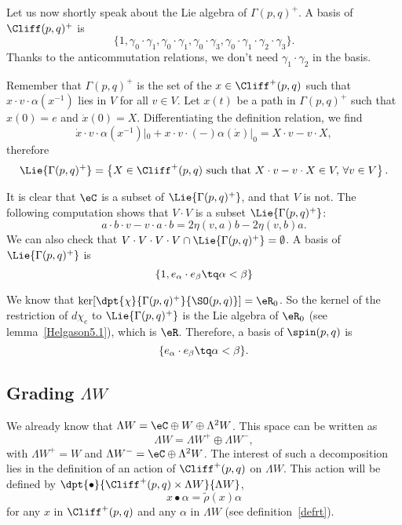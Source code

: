 Let us now shortly speak about the Lie algebra of $\Gamma(p,q)^+$. A basis of $\Cliff(p,q)^+$ is \[\{1,\gamma_0\cdot\gamma_1,\gamma_0\cdot\gamma_1 ,\gamma_0\cdot\gamma_3
	,\gamma_0\cdot\gamma_1\cdot\gamma_2\cdot\gamma_3  \}.\] Thanks to the anticommutation relations, we don't need $\gamma_1\cdot\gamma_2$ in the basis.

Remember that $\Gamma(p,q)^+$ is the set of the $x\in\Cliff^+(p,q)$ such that $x\cdot v\cdot\alpha(x^{-1})$ lies in $V$ for all $v\in V$. Let $x(t)$ be a path in $\Gamma(p,q)^+$ such that $x(0)=e$ and $\dot{x}(0)=X$. Differentiating the definition relation, we find
\[
	\dot{x}\cdot v\cdot\alpha(x^{-1})|_0+x\cdot v\cdot(-)\alpha(\dot{x})|_0=X\cdot v-v\cdot X,
\]
therefore
\[
	\Lie{\Gamma(p,q)^+}=\left\{X\in\Cliff^+(p,q)\textrm{ such that } X\cdot v-v\cdot X\in V,\,\forall v\in V\right\}.
\]

It is clear that $\eC$ is a subset of $\Lie{\Gamma(p,q)^+}$, and that $V$ is not. The following computation shows that $V\cdot V$ is a subset $\Lie{\Gamma(p,q)^+}$:
\[
	a\cdot b\cdot v-v\cdot a\cdot b=2\eta(v,a)b-2\eta(v,b)a.
\]
We can also check that $V\cdot V\cdot V\cdot V\cap\Lie{\Gamma(p,q)^+}=\emptyset$. A basis of $\Lie{\Gamma(p,q)^+}$ is
\[
	\{ 1,e_{\alpha}\cdot e_{\beta}\tq \alpha<\beta \}
\]

We know that $\ker[\dpt{\chi}{\Gamma(p,q)^+}{\SO(p,q)}]=\eR_0$. So the kernel of the restriction of $d\chi_e$ to $\Lie{\Gamma(p,q)^+}$ is the Lie algebra of $\eR_0$ (see lemma~\ref{Helgason5.1}), which is $\eR$. Therefore, a basis of $\spin(p,q)$ is
\[
	\{e_{\alpha}\cdot e_{\beta}\tq \alpha<\beta\}.
\]

\subsection{Grading \texorpdfstring{$\Lambda W$}{LW}}

We already know that $\Lambda W=\eC\oplus W\oplus\Lambda^2W$. This space can be written as \[\Lambda W =\Lambda W^+\oplus\Lambda W^-,\] with $\Lambda W^+=W$ and $\Lambda W^-=\eC\oplus\Lambda^2W$. The interest of such a decomposition lies in the definition of an action of $\Cliff^+(p,q)$ on $\Lambda W $. This action will be defined by $\dpt{\bullet}{\Cliff^+(p,q)\times\Lambda W }{\Lambda W }$,
\[
	x\bullet\alpha=\tilde\rho(x)\alpha
\]
for any $x$ in $\Cliff^+(p,q)$ and any $\alpha$ in $\Lambda W $ (see definition~\ref{defrt}).

